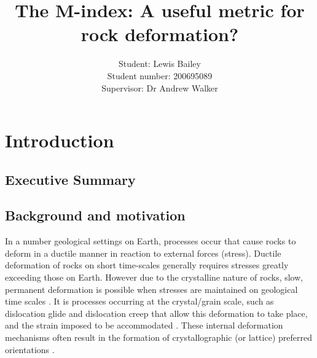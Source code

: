 \documentclass[a4paper,12pt]{report}
\title{\textbf{The M-index: A useful metric for rock deformation?}}
\author{Student: Lewis Bailey\\Student number: 200695089\\Supervisor: Dr Andrew Walker}
\date{}
\numberwithin{equation}{chapter}
\begin{document}

\maketitle

\tableofcontents

\listoffigures
\listoftables

\chapter{Introduction} \label{chap:intro}
\vspace{-1cm}

\section{Executive Summary} \label{sec:summary}

\section{Background and motivation} \label{sec:background}
In a number geological settings on Earth, processes occur that cause rocks to deform in a ductile manner in reaction to external forces (stress). Ductile deformation of rocks on short time-scales generally requires stresses greatly exceeding those on Earth. However due to the crystalline nature of rocks, slow, permanent deformation is possible when stresses are maintained on geological time scales \citep{Weiss1985}. It is processes occurring at the crystal/grain scale, such as dislocation glide and dislocation creep that allow this deformation to take place, and the strain imposed to be accommodated \citep{Ashby1972}. These internal deformation mechanisms often result in the formation of crystallographic (or lattice) preferred orientations \citep{Price1985}. 
\end{document}
